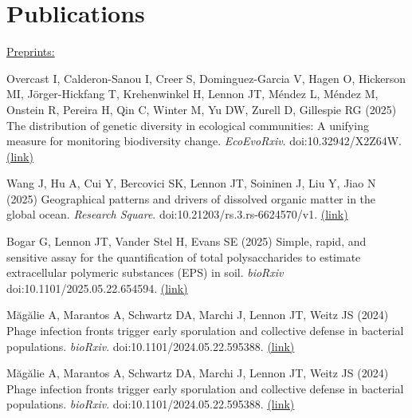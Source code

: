 \documentclass[11pt]{article}
\begin{document}
\section*{Publications}
\vspace{-0.25em} %
\begin{etaremune}

\item[] \textnormal{\underline{Preprints:}}


\item Overcast I, Calderon-Sanou I, Creer S, Dominguez-Garcia V, Hagen O, Hickerson MI, Jörger-Hickfang T, Krehenwinkel H, Lennon JT, Méndez L, Méndez M, Onstein R, Pereira H, Qin C, Winter M, Yu DW, Zurell D, Gillespie RG (2025) The distribution of genetic diversity in ecological communities: A unifying measure for monitoring biodiversity change. \textit{EcoEvoRxiv}. doi:10.32942/X2Z64W. \href{https://ecoevorxiv.org/repository/view/9169/}{(link)}

\item Wang J, Hu A, Cui Y, Bercovici SK, Lennon JT, Soininen J, Liu Y, Jiao N (2025) Geographical patterns and drivers of dissolved organic matter in the global ocean. \textit{Research Square}. doi:10.21203/rs.3.rs-6624570/v1. \href{https://assets-eu.researchsquare.com/files/rs-6624570/v1/a75822e6-0649-4c95-919e-3ba016f0bc96.pdf?c=1747022553}{(link)}

\item Bogar G, Lennon JT, Vander Stel H, Evans SE (2025) Simple, rapid, and sensitive assay for the quantification of total polysaccharides to estimate extracellular polymeric substances (EPS) in soil. \textit{bioRxiv} doi:10.1101/2025.05.22.654594. \href{https://www.biorxiv.org/content/10.1101/2025.05.22.654594v1}{(link)}

\item Măgălie A, Marantos A, Schwartz DA, Marchi J, Lennon JT, Weitz JS (2024) Phage infection fronts trigger early sporulation and collective defense in bacterial populations. \textit{bioRxiv}. doi:10.1101/2024.05.22.595388. \href{https://www.biorxiv.org/content/10.1101/2024.05.22.595388v1.full.pdf}{(link)}
\item Măgălie A, Marantos A, Schwartz DA, Marchi J, Lennon JT, Weitz JS (2024) Phage infection fronts trigger early sporulation and collective defense in bacterial populations. \textit{bioRxiv}. doi:10.1101/2024.05.22.595388. \href{https://www.biorxiv.org/content/10.1101/2024.05.22.595388v1.full.pdf}{(link)}


\end{etaremune}
\end{document}
